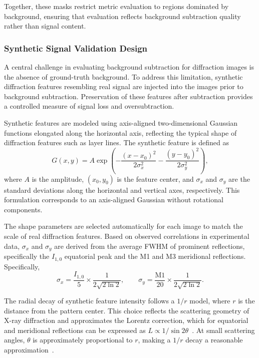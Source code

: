\documentclass[iucr]{iucrjournals}
\begin{document}
Together, these masks restrict metric evaluation to regions dominated by background, ensuring that evaluation reflects background subtraction quality rather than signal content.

\subsubsection{Synthetic Signal Validation Design}

A central challenge in evaluating background subtraction for diffraction images is the absence of ground-truth background. To address this limitation, synthetic diffraction features resembling real signal are injected into the images prior to background subtraction. Preservation of these features after subtraction provides a controlled measure of signal loss and oversubtraction.

Synthetic features are modeled using axis-aligned two-dimensional Gaussian functions elongated along the horizontal axis, reflecting the typical shape of diffraction features such as layer lines. The synthetic feature is defined as
\begin{equation}
G(x, y) = A \exp\!\left(
-\frac{(x-x_0)^2}{2\sigma_x^2}
-\frac{(y-y_0)^2}{2\sigma_y^2}
\right),
\end{equation}
where $A$ is the amplitude, $(x_0, y_0)$ is the feature center, and $\sigma_x$ and $\sigma_y$ are the standard deviations along the horizontal and vertical axes, respectively. This formulation corresponds to an axis-aligned Gaussian without rotational components.

The shape parameters are selected automatically for each image to match the scale of real diffraction features. Based on observed correlations in experimental data, $\sigma_x$ and $\sigma_y$ are derived from the average FWHM of prominent reflections, specifically the $I_{1,0}$ equatorial peak and the M1 and M3 meridional reflections. Specifically,
\begin{equation}
\sigma_x = \frac{I_{1,0}}{5} \times \frac{1}{2\sqrt{2\ln2}}, 
\qquad
\sigma_y = \frac{\mathrm{M1}}{20} \times \frac{1}{2\sqrt{2\ln2}}.
\end{equation}

The radial decay of synthetic feature intensity follows a $1/r$ model, where $r$ is the distance from the pattern center. This choice reflects the scattering geometry of X-ray diffraction and approximates the Lorentz correction, which for equatorial and meridional reflections can be expressed as $L \propto 1/\sin 2\theta$~\cite{Buerger1940}. At small scattering angles, $\theta$ is approximately proportional to $r$, making a $1/r$ decay a reasonable approximation~\cite{Denny1995}.
\end{document}
